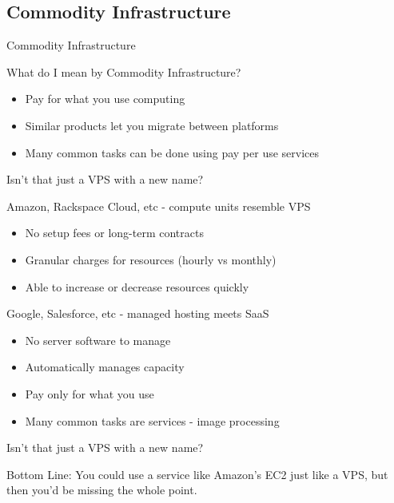\documentclass{beamer}
\begin{document}
\subsection{Commodity Infrastructure}

\begin{frame}{Commodity Infrastructure}
  \begin{block}{What do I mean by Commodity Infrastructure?}
    \begin{itemize}
    \item Pay for what you use computing
    \item Similar products let you migrate between platforms
    \item Many common tasks can be done using pay per use services
    \end{itemize}
  \end{block}
\end{frame}


\begin{frame}{Isn't that just a VPS with a new name?}
\pause
\begin{block}{Amazon, Rackspace Cloud, etc - compute units resemble VPS}
  \begin{itemize}
  \item No setup fees or long-term contracts
  \item Granular charges for resources (hourly vs monthly)
  \item Able to increase or decrease resources quickly
  \end{itemize}
\end{block}
\pause
\begin{block}{Google, Salesforce, etc - managed hosting meets SaaS}
  \begin{itemize}
  \item No server software to manage
  \item Automatically manages capacity
  \item Pay only for what you use
  \item Many common tasks are services - image processing
  \end{itemize}
\end{block}
\end{frame}

\begin{frame}{Isn't that just a VPS with a new name?}
  \begin{block}{Bottom Line:}
    You could use a service like Amazon's EC2 just like a VPS, but then you'd be missing the whole point.
  \end{block}
\end{frame}
\end{document}
